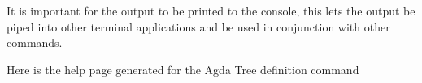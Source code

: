 It is important for the output to be printed to the console, this lets the
output be piped into other terminal applications and be used in conjunction
with other commands.



Here is the help page generated for the Agda Tree definition command

